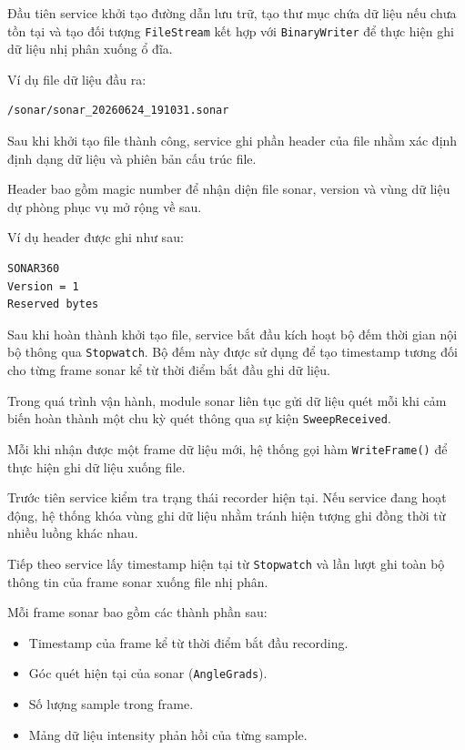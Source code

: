 \documentclass[../DoAn.tex]{subfiles}
\begin{document}
Đầu tiên service khởi tạo đường dẫn lưu trữ, tạo thư mục chứa dữ liệu nếu chưa tồn tại và tạo đối tượng \texttt{FileStream} kết hợp với \texttt{BinaryWriter} để thực hiện ghi dữ liệu nhị phân xuống ổ đĩa.

Ví dụ file dữ liệu đầu ra:

\begin{verbatim}
/sonar/sonar_20260624_191031.sonar
\end{verbatim}

Sau khi khởi tạo file thành công, service ghi phần header của file nhằm xác định định dạng dữ liệu và phiên bản cấu trúc file.

Header bao gồm magic number để nhận diện file sonar, version và vùng dữ liệu dự phòng phục vụ mở rộng về sau.

Ví dụ header được ghi như sau:

\begin{verbatim}
SONAR360
Version = 1
Reserved bytes
\end{verbatim}

Sau khi hoàn thành khởi tạo file, service bắt đầu kích hoạt bộ đếm thời gian nội bộ thông qua \texttt{Stopwatch}. Bộ đếm này được sử dụng để tạo timestamp tương đối cho từng frame sonar kể từ thời điểm bắt đầu ghi dữ liệu.

Trong quá trình vận hành, module sonar liên tục gửi dữ liệu quét mỗi khi cảm biến hoàn thành một chu kỳ quét thông qua sự kiện \texttt{SweepReceived}.

Mỗi khi nhận được một frame dữ liệu mới, hệ thống gọi hàm \texttt{WriteFrame()} để thực hiện ghi dữ liệu xuống file.

Trước tiên service kiểm tra trạng thái recorder hiện tại. Nếu service đang hoạt động, hệ thống khóa vùng ghi dữ liệu nhằm tránh hiện tượng ghi đồng thời từ nhiều luồng khác nhau.

Tiếp theo service lấy timestamp hiện tại từ \texttt{Stopwatch} và lần lượt ghi toàn bộ thông tin của frame sonar xuống file nhị phân.

Mỗi frame sonar bao gồm các thành phần sau:

\begin{itemize}
    \item Timestamp của frame kể từ thời điểm bắt đầu recording.
    \item Góc quét hiện tại của sonar (\texttt{AngleGrads}).
    \item Số lượng sample trong frame.
    \item Mảng dữ liệu intensity phản hồi của từng sample.
\end{itemize}
\end{document}
